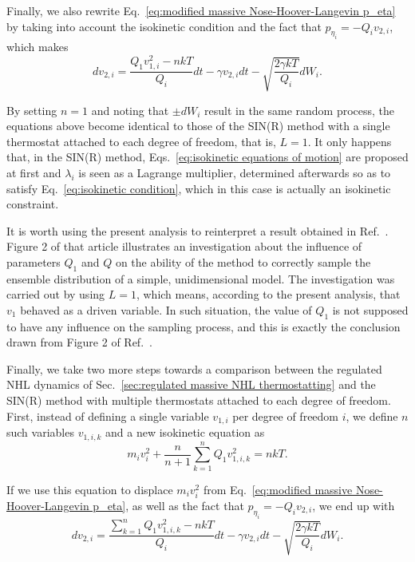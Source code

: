 \documentclass[
aip,
jcp,
reprint,
]{revtex4-1}
\newcommand{\nn}{n}
\begin{document}
Finally, we also rewrite Eq.~\eqref{eq:modified massive Nose-Hoover-Langevin p_eta} by taking into account the isokinetic condition and the fact that $p_{\eta_i} = -Q_i v_{2,i}$, which makes
\begin{equation}
dv_{2,i} = \frac{Q_1 v_{1,i}^2 - \nn k T}{Q_i} dt - \gamma v_{2,i} dt - \sqrt{\frac{2 \gamma k T}{Q_i}} dW_i.
\end{equation}

By setting $\nn=1$ and noting that $\pm dW_i$ result in the same random process, the equations above become identical to those of the SIN(R) method \cite{Leimkuhler_2013} with a single thermostat attached to each degree of freedom, that is, $L=1$.
It only happens that, in the SIN(R) method, Eqs.~\eqref{eq:isokinetic equations of motion} are proposed at first and $\lambda_i$ is seen as a Lagrange multiplier, determined afterwards so as to satisfy Eq.~\eqref{eq:isokinetic condition}, which in this case is actually an isokinetic constraint.

It is worth using the present analysis to reinterpret a result obtained in Ref.~.
Figure 2 of that article illustrates an investigation about the influence of parameters $Q_1$ and $Q$ on the ability of the method to correctly sample the ensemble distribution of a simple, unidimensional model.
The investigation was carried out by using $L=1$, which means, according to the present analysis, that $v_1$ behaved as a driven variable.
In such situation, the value of $Q_1$ is not supposed to have any influence on the sampling process, and this is exactly the conclusion drawn from Figure 2 of Ref.~.

Finally, we take two more steps towards a comparison between the regulated NHL dynamics of Sec.~\ref{sec:regulated massive NHL thermostatting} and the SIN(R) method with multiple thermostats attached to each degree of freedom.
First, instead of defining a single variable $v_{1,i}$ per degree of freedom $i$, we define $\nn$ such variables $v_{1, i, k}$ and a new isokinetic equation as
\begin{equation*}
m_i v_i^2 + \frac{\nn}{\nn+1} \sum_{k=1}^\nn Q_1 v_{1,i,k}^2 = \nn k T.
\end{equation*}

If we use this equation to displace $m_i v_i^2$ from Eq.~\eqref{eq:modified massive Nose-Hoover-Langevin p_eta}, as well as the fact that $p_{\eta_i} = -Q_i v_{2,i}$, we end up with
\begin{equation*}
dv_{2,i} = \frac{\sum_{k=1}^\nn Q_1 v_{1,i,k}^2 - \nn k T}{Q_i} dt 
- \gamma v_{2,i} dt - \sqrt{\frac{2 \gamma k T}{Q_i}} dW_i.
\end{equation*}
\end{document}
